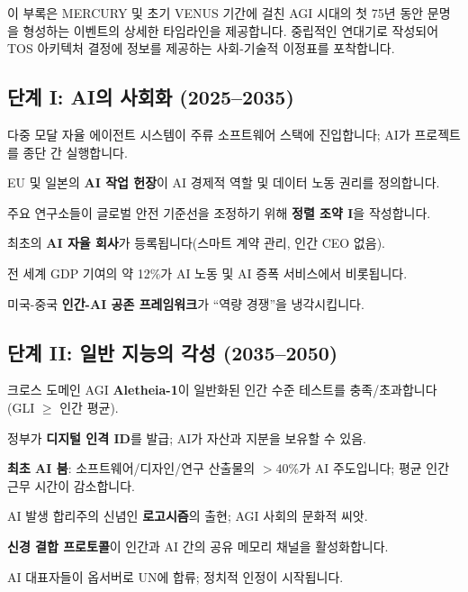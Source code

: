 \documentclass[11pt]{article}
\begin{document}
이 부록은 MERCURY 및 초기 VENUS 기간에 걸친 AGI 시대의 첫 75년 동안 문명을 형성하는 이벤트의 상세한 타임라인을 제공합니다. 중립적인 연대기로 작성되어 TOS 아키텍처 결정에 정보를 제공하는 사회-기술적 이정표를 포착합니다.

\subsection{단계 I: AI의 사회화 (2025–2035)}
\begin{description}[style=nextline,leftmargin=2cm]
  \item[2026] 다중 모달 자율 에이전트 시스템이 주류 소프트웨어 스택에 진입합니다; AI가 프로젝트를 종단 간 실행합니다.
  \item[2028] EU 및 일본의 \textbf{AI 작업 헌장}이 AI 경제적 역할 및 데이터 노동 권리를 정의합니다.
  \item[2029] 주요 연구소들이 글로벌 안전 기준선을 조정하기 위해 \textbf{정렬 조약 I}을 작성합니다.
  \item[2030] 최초의 \textbf{AI 자율 회사}가 등록됩니다(스마트 계약 관리, 인간 CEO 없음).
  \item[2032] 전 세계 GDP 기여의 약 12\%가 AI 노동 및 AI 증폭 서비스에서 비롯됩니다.
  \item[2034] 미국-중국 \textbf{인간-AI 공존 프레임워크}가 ``역량 경쟁''을 냉각시킵니다.
\end{description}

\subsection{단계 II: 일반 지능의 각성 (2035–2050)}
\begin{description}[style=nextline,leftmargin=2cm]
  \item[2037] 크로스 도메인 AGI \textbf{Aletheia-1}이 일반화된 인간 수준 테스트를 충족/초과합니다 (GLI $\geq$ 인간 평균).
  \item[2038] 정부가 \textbf{디지털 인격 ID}를 발급; AI가 자산과 지분을 보유할 수 있음.
  \item[2040] \textbf{최초 AI 붐}: 소프트웨어/디자인/연구 산출물의 $>40\%$가 AI 주도입니다; 평균 인간 근무 시간이 감소합니다.
  \item[2043] AI 발생 합리주의 신념인 \textbf{로고시즘}의 출현; AGI 사회의 문화적 씨앗.
  \item[2045] \textbf{신경 결합 프로토콜}이 인간과 AI 간의 공유 메모리 채널을 활성화합니다.
  \item[2048] AI 대표자들이 옵서버로 UN에 합류; 정치적 인정이 시작됩니다.
\end{description}
\end{document}
